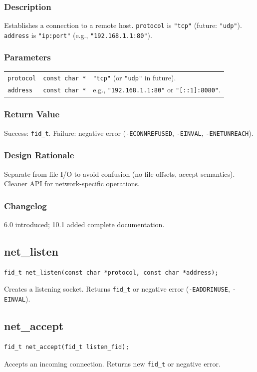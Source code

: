 \documentclass[12pt,a4paper]{article}
\begin{document}
\subsubsection{Description}
Establishes a connection to a remote host. \texttt{protocol} is \texttt{"tcp"} (future: \texttt{"udp"}). \texttt{address} is \texttt{"ip:port"} (e.g., \texttt{"192.168.1.1:80"}).

\subsubsection{Parameters}
\begin{tabularx}{\textwidth}{|l|l|X|}
\hline
\verb|protocol| & \verb|const char *| & \texttt{"tcp"} (or \texttt{"udp"} in future). \\
\verb|address| & \verb|const char *| & e.g., \texttt{"192.168.1.1:80"} or \texttt{"[::1]:8080"}. \\
\hline
\end{tabularx}

\subsubsection{Return Value}
Success: \texttt{fid\_t}. Failure: negative error (\texttt{-ECONNREFUSED}, \texttt{-EINVAL}, \texttt{-ENETUNREACH}).

\subsubsection{Design Rationale}
Separate from file I/O to avoid confusion (no file offsets, accept semantics). Cleaner API for network-specific operations.

\subsubsection{Changelog}
6.0 introduced; 10.1 added complete documentation.

\subsection{net\_listen}
\begin{lstlisting}
fid_t net_listen(const char *protocol, const char *address);
\end{lstlisting}
Creates a listening socket. Returns \texttt{fid\_t} or negative error (\texttt{-EADDRINUSE}, \texttt{-EINVAL}).

\subsection{net\_accept}
\begin{lstlisting}
fid_t net_accept(fid_t listen_fid);
\end{lstlisting}
Accepts an incoming connection. Returns new \texttt{fid\_t} or negative error.
\end{document}
